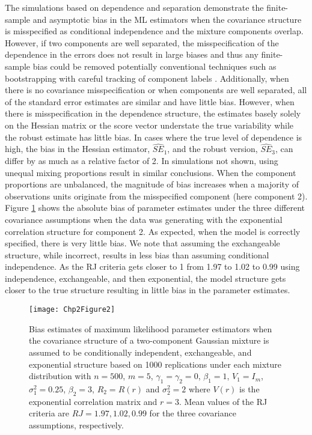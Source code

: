 \documentclass[10pt]{article}
\begin{document}
The simulations based on dependence and separation demonstrate the finite-sample and asymptotic bias in the ML estimators when the covariance structure is misspecified as conditional independence and the mixture components overlap. However, if two components are well separated, the misspecification of the dependence in the errors does not result in large biases and thus any finite-sample bias could be removed potentially conventional techniques such as bootstrapping with careful tracking of component labels \cite{grun2004}. Additionally, when there is no covariance misspecification or when components are well separated, all of the standard error estimates are similar and have little bias. However, when there is misspecification in the dependence structure, the estimates basely solely on the Hessian matrix or the score vector understate the true variability while the robust estimate has little bias. In cases where the true level of dependence is high, the bias in the Hessian estimator, $\widehat{SE}_{1}$, and the robust version, $\widehat{SE}_{3}$, can differ by as much as a relative factor of 2. In simulations not shown, using unequal mixing proportions result in similar conclusions. When the component proportions are unbalanced, the magnitude of bias increases when a majority of observations units originate from the misspecified component (here component 2). \\

Figure \ref{fig:2-2} shows the absolute bias of parameter estimates under the three different covariance assumptions when the data was generating with the exponential correlation structure for component 2. As expected, when the model is correctly specified, there is very little bias. We note that assuming the exchangeable structure, while incorrect, results in less bias than assuming conditional independence. As the RJ criteria gets closer to 1 from 1.97 to 1.02 to 0.99 using independence, exchangeable, and then exponential, the model structure gets closer to the true structure resulting in little bias in the parameter estimates.
\begin{figure}
\begin{center}
\texttt{[image: Chp2Figure2]}
\end{center}
\caption{Bias estimates of maximum likelihood parameter estimators when the covariance structure of a two-component Gaussian mixture is assumed to be conditionally independent, exchangeable, and exponential structure based on 1000 replications under each mixture distribution with $n=500$, $m=5$, $\gamma_1=\gamma_2=0$, $\beta_{1}=1$, $V_1=I_{m}$, $\sigma_1^{2}=0.25$, $\beta_2=3$, $R_2=R(r)$ and $\sigma_2^{2}=2$ where $V(r)$ is the exponential correlation matrix and $r=3$. Mean values of the RJ criteria are $RJ = 1.97, 1.02, 0.99$ for the three covariance assumptions, respectively.}
\label{fig:2-2}
\end{figure}
\end{document}
